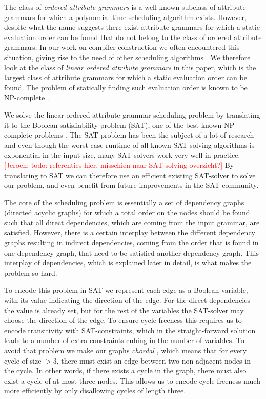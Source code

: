 \documentclass{llncs}
\newif\iffinal\finalfalse
\newcommand{\REM}[3]{\iffinal\else\textcolor{#2}{[#1: #3]}\fi}
\newcommand{\Jeroen}[1]{\REM{Jeroen}{red}{#1}}
\begin{document}
The class of \emph{ordered attribute grammars} \cite{kastens80} is a well-known subclass of attribute grammars for which a polynomial time scheduling algorithm exists. However, despite what the name suggests there exist attribute grammars for which a static evaluation order can be found that do not belong to the class of ordered attribute grammars. In our work on compiler construction we often encountered this situation, giving rise to the need of other scheduling algorithms \cite{bransen2012,Binsbergen:2015}. We therefore look at the class of \emph{linear ordered attribute grammars} in this paper, which is the largest class of attribute grammars for which a static evaluation order can be found. The problem of statically finding such evaluation order is known to be NP-complete \cite{engelfriet82}.

We solve the linear ordered attribute grammar scheduling problem by translating it to the Boolean satisfiability problem (SAT), one of the best-known NP-complete problems \cite{Cook:1971}. The SAT problem has been the subject of a lot of research and even though the worst case runtime of all known SAT-solving algorithms is exponential in the input size, many SAT-solvers work very well in practice. \Jeroen{todo: referenties hier, misschien naar SAT-solving overzicht?} By translating to SAT we can therefore use an efficient existing SAT-solver to solve our problem, and even benefit from future improvements in the SAT-community.

The core of the scheduling problem is essentially a set of dependency graphs (directed acyclic graphs) for which a total order on the nodes should be found such that all direct dependencies, which are coming from the input grammar, are satisfied. However, there is a certain interplay between the different dependency graphs resulting in indirect dependencies, coming from the order that is found in one dependency graph, that need to be satisfied another dependency graph. This interplay of dependencies, which is explained later in detail, is what makes the problem so hard.

To encode this problem in SAT we represent each edge as a Boolean variable, with its value indicating the direction of the edge. For the direct dependencies the value is already set, but for the rest of the variables the SAT-solver may choose the direction of the edge. To ensure cycle-freeness this requires us to encode transitivity with SAT-constraints, which in the straight-forward solution leads to a number of extra constraints cubing in the number of variables. To avoid that problem we make our graphs \emph{chordal} \cite{Dirac:1961}, which means that for every cycle of size $> 3$, there must exist an edge between two non-adjacent nodes in the cycle. In other words, if there exists a cycle in the graph, there must also exist a cycle of at most three nodes. This allows us to encode cycle-freeness much more efficiently by only disallowing cycles of length three.
\end{document}
